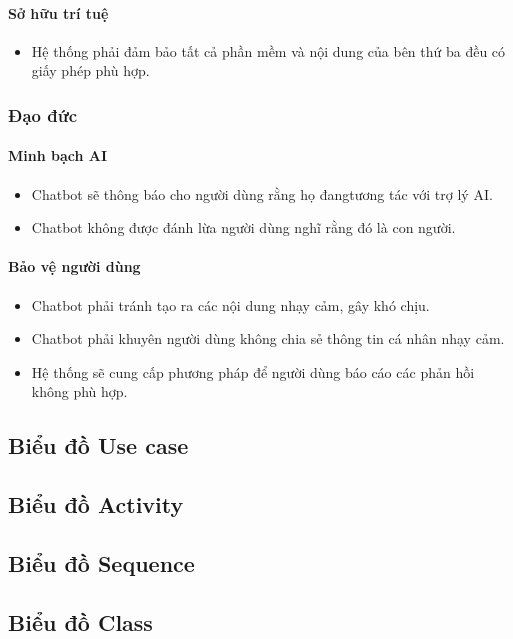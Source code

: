 \paragraph{Sở hữu trí tuệ}
\begin{itemize}
    \item Hệ thống phải đảm bảo tất cả phần mềm và nội dung của bên thứ ba đều có giấy phép phù hợp.
\end{itemize}

\subsubsection{Đạo đức}

\paragraph{Minh bạch AI}
\begin{itemize}
    \item Chatbot sẽ thông báo cho người dùng rằng họ đangtương tác với trợ lý AI.
    \item Chatbot không được đánh lừa người dùng nghĩ rằng đó là con người.
\end{itemize}

\paragraph{Bảo vệ người dùng}
\begin{itemize}
    \item Chatbot phải tránh tạo ra các nội dung nhạy cảm, gây khó chịu.
    \item Chatbot phải khuyên người dùng không chia sẻ thông tin cá nhân nhạy cảm.
    \item Hệ thống sẽ cung cấp phương pháp để người dùng báo cáo các phản hồi không phù hợp.
\end{itemize}

\subsection{Biểu đồ Use case}

\subsection{Biểu đồ Activity}

\subsection{Biểu đồ Sequence}


\subsection{Biểu đồ Class}

